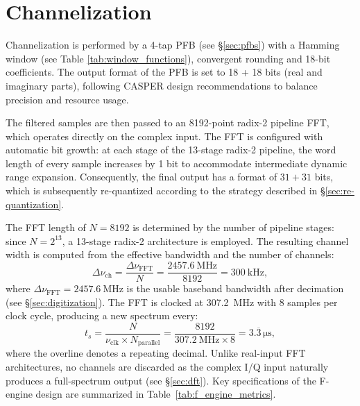 \label{sec:lo_generation}

\section{Channelization}
\label{sec:channelization}

Channelization is performed by a 4-tap PFB (see \S\ref{sec:pfbs}) with a Hamming window (see Table \ref{tab:window_functions}), convergent rounding and 18-bit coefficients. The output format of the PFB is set to 18 + 18 bits (real and imaginary parts), following CASPER design recommendations to balance precision and resource usage. 

The filtered samples are then passed to an \num{8192}-point radix-2 pipeline FFT, which operates directly on the complex input. The FFT is configured with automatic bit growth: at each stage of the 13-stage radix-2 pipeline, the word length of every sample increases by 1 bit to accommodate intermediate dynamic range expansion. Consequently, the final output has a format of $31 + 31$ bits, which is subsequently re-quantized according to the strategy described in \S\ref{sec:re-quantization}. 

The FFT length of $N=8192$ is determined by the number of pipeline stages: since $N=2^{13}$, a 13-stage radix-2 architecture is employed. The resulting channel width is computed from the effective bandwidth and the number of channels:
\begin{equation}
	\Delta\nu_\text{ch} = \frac{\Delta\nu_\text{FFT}}{N} = \frac{\SI{2457.6}{\mega\hertz}}{8192} = \SI{300}{\kilo\hertz},
\end{equation}
where $\Delta\nu_\text{FFT}=\SI{2457.6}{\mega\hertz}$ is the usable baseband bandwidth after decimation (see \S\ref{sec:digitization}). The FFT is clocked at \SI{307.2}{\mega\hertz} with 8 samples per clock cycle, producing a new spectrum every:
\begin{equation}
	t_s=\frac{N}{\nu_\text{clk} \times N_\text{parallel}}=\frac{8192}{\SI{307.2}{\mega\hertz}\times8}=3.\overline{3}\,\unit{\micro\second},
\end{equation}
where the overline denotes a repeating decimal. Unlike real-input FFT architectures, no channels are discarded as the complex I/Q input naturally produces a full-spectrum output (see \S\ref{sec:dft}). Key specifications of the F-engine design are summarized in Table~\ref{tab:f_engine_metrics}.

